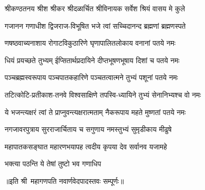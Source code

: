 
\twolineshloka
{श्रीकण्ठतनय श्रीश श्रीकर श्रीदळार्चित}
{श्रीविनायक सर्वेश श्रियं वासय मे कुले}

\twolineshloka
{गजानन गणाधीश द्विजराज-विभूषित}
{भजे त्वां सच्चिदानन्द ब्रह्मणां ब्रह्मणस्पते}

\twolineshloka
{णषष्ठवाच्यनाशाय रोगाटविकुठारिणे}
{घृणापालितलोकाय वनानां पतये नमः}

\twolineshloka
{धियं प्रयच्छते तुभ्यम् ईप्सितार्थप्रदायिने}
{दीप्तभूषणभूषाय दिशां च पतये नमः}

\twolineshloka
{पञ्चब्रह्मस्वरूपाय पञ्चपातकहारिणे}
{पञ्चतत्वात्मने तुभ्यं पशूनां पतये नमः}

\twolineshloka
{तटित्कोटि-प्रतीकाश-तनवे विश्वसाक्षिणे}
{तपस्वि-ध्यायिने तुभ्यं सेनानिभ्यश्च वो नमः}

\twolineshloka
{ये भजन्त्यक्षरं त्वां ते प्राप्नुवन्त्यक्षरात्मताम्}
{नैकरूपाय महते मुष्णतां पतये नमः}

\twolineshloka
{नगजावरपुत्राय सुरराजार्चिताय च}
{सगुणाय नमस्तुभ्यं सुमृडीकाय मीढुषे}

\twolineshloka
{महापातकसङ्घात महारणभयापह}
{त्वदीय कृपया देव सर्वानव यजामहे}


{भक्त्या पठन्ति ये तेषां तुष्टो भव गणाधिप}

॥इति श्री~महागणपति नवार्णवेदपादस्तवः सम्पूर्णः॥